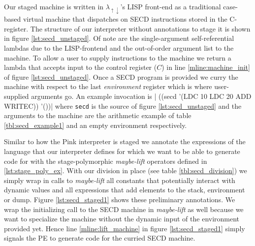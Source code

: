 \documentclass[a4paper,12pt,twoside,openright]{report}
\theoremstyle{definition}
\newcommand{\mslang}{$\lambda_{\uparrow\downarrow}$}
\begin{document}
Our staged machine is written in \mslang's LISP front-end as a traditional case-based virtual machine that dispatches on SECD instructions stored in the C-register. The structure of our interpreter without annotations to stage it is shown in figure \ref{lst:secd_unstaged}. Of note are the single-argument self-referential lambdas due to the LISP-frontend and the out-of-order argument list to the machine. To allow a user to supply instructions to the machine we return a lambda that accepts input to the control register ($C$) in line \ref{mline:machine_init} of figure \ref{lst:secd_unstaged}. Once a SECD program is provided we curry the machine with respect to the last \textit{environment} register which is where user-supplied arguments go. An example invocation is |  ((secd '(LDC 10 LDC 20 ADD WRITEC)) '())| where \texttt{secd} is the source of figure \ref{lst:secd_unstaged} and the arguments to the machine are the arithmetic example of table \ref{tbl:secd_example1} and an empty environment respectively.

Similar to how the Pink interpreter is staged \cite{amin2017collapsing} we annotate the expressions of the language that our interpreter defines for which we want to be able to generate code for with the stage-polymorphic \textit{maybe-lift} operators defined in \ref{lst:stage_poly_ex}. With our division in place (see table \ref{tbl:secd_division}) we simply wrap in calls to \textit{maybe-lift} all constants that potentially interact with dynamic values and all expressions that add elements to the stack, environment or dump. Figure \ref{lst:secd_staged1} shows these preliminary annotations. We wrap the initializing call to the SECD machine in \textit{maybe-lift} as well because we want to specialize the machine without the dynamic input of the environment provided yet. Hence line \ref{mline:lift_machine} in figure \ref{lst:secd_staged1} simply signals the PE to generate code for the curried SECD machine.
\end{document}
